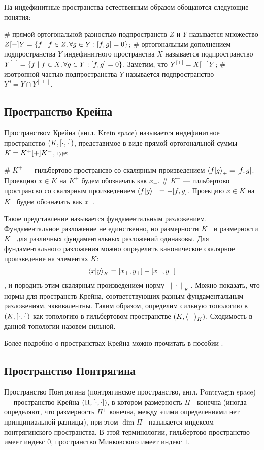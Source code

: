 На индефинитные пространства естественным образом обощаются следующие понятия:
\begin{ilist}
# прямой ортогональной разностью подпространств $Z$ и $Y$ называется множество $Z [-] Y = \{f \mid f \in Z, \forall g \in Y: [f,g] = 0 \}$;
# ортогональным дополнением подпространства $Y$ индефинитного пространства $X$ называется подпространство $Y^{[\perp]} = \{f \mid f \in X, \forall g \in Y: [f,g] = 0 \}$. Заметим, что $Y^{[\perp]} = X [-] Y$;
# изотропной частью подпространства $Y$ называется подпространство $Y^0 = Y \cap Y^{[\perp]}$.
\end{ilist}

\subsection{Пространство Крейна}

Пространством Крейна (англ. Krein space) называется индефинитное пространство $(K, [\cdot,\cdot])$, представимое в виде прямой ортогональной суммы $K = K^+ [+] K^-$, где:
\begin{ilist}
# $K^+$ — гильбертово пространсво со скалярным произведением $\ip{f}{g}_+ = \iip{f}{g}$. Проекцию $x \in K$ на $K^+$ будем обозначать как $x_+$.
# $K^-$ — гильбертово пространсво со скалярным произведением $\ip{f}{g}_- = -\iip{f}{g}$. Проекцию $x \in K$ на $K^-$ будем обозначать как $x_-$.
\end{ilist}
Такое представление называется фундаментальным разложением. Фундаментальное разложение не единственно, но размерности $K^+$ и размерности $K^-$ для различных фундаментальных разложений одинаковы. Для фундаментального разложения можно определить каноническое скалярное произведение на элементах $K$:
\[
\ip{x}{y}_K = \iip{x_+}{y_+} - \iip{x_-}{y_-}
\]
, и породить этим скалярным произведением норму $\|\cdot\|_K$. Можно показать, что нормы для пространств Крейна, соответствующих разным фундаментальным разложениям, эквивалентны. Таким образом, определим сильную топологию в $(K, [\cdot,\cdot])$ как топологию в гильбертовом пространстве $(K, \ipcdot_K)$. Сходимость в данной топологии назовем сильной.

Более подробно о пространствах Крейна можно прочитать в пособии \cite{azizov_krein}.
\subsection{Пространство Понтрягина}
Пространство Понтрягина (понтрягинское пространство, англ. Pontryagin space) — пространство Крейна $(\Pi, [\cdot,\cdot])$, в котором размерность $\Pi^-$ конечна (иногда определяют, что размерность $\Pi^+$ конечна, между этими определениями нет принципиальной разницы), при этом $\dim \Pi^-$ называется индексом понтрягинского пространства. В этой терминологии, гильбертово пространство имеет индекс $0$, пространство Минковского имеет индекс $1$.


